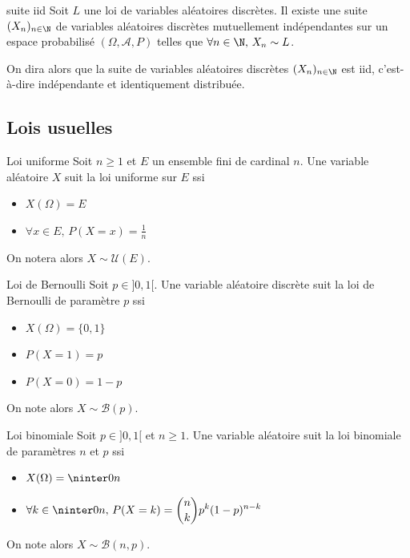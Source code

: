 \begin{corollaire}{suite iid}{}
    Soit $L$ une loi de variables aléatoires discrètes. Il existe une suite 
    $(X_n)_{n \in \N}$ de variables aléatoires discrètes mutuellement indépendantes
    sur un espace probabilisé $(\Omega, \mathcal A, P)$ telles que $\forall n \in \N, \, X_n \sim L$.

    On dira alors que la suite de variables aléatoires discrètes $(X_n)_{n \in \N}$ 
    est iid, c'est-à-dire indépendante et identiquement distribuée.
\end{corollaire}

\subsection{Lois usuelles}

\begin{definition}{Loi uniforme}{}
    Soit $n \geqslant 1$ et $E$ un ensemble fini de cardinal $n$. Une variable aléatoire $X$ suit la 
    loi uniforme sur $E$ ssi 
    \begin{itemize}
        \item $X(\Omega) = E$
        \item $\forall x \in E, \, P(X = x) = \frac 1 n$
    \end{itemize}

    On notera alors $X \sim \mathcal U(E)$.
\end{definition}


\begin{definition}{Loi de Bernoulli}{}
    Soit $p \in ]0, 1[$. Une variable aléatoire discrète suit la loi de Bernoulli de paramètre 
    $p$ ssi 
    \begin{itemize}
        \item $X(\Omega) = \{0, 1\}$
        \item $P(X = 1) = p$ 
        \item $P(X = 0) = 1 - p$
    \end{itemize}
    On note alors $X \sim \mathcal B(p)$.
\end{definition}

\begin{definition}{Loi binomiale}{}
    Soit $p \in ]0, 1[$ et $n \geqslant 1$. Une variable aléatoire suit la loi binomiale de 
    paramètres $n$ et $p$ ssi 
    \begin{itemize}
        \item $X(\Omega) = \ninter 0 n$
        \item $\displaystyle \forall k \in \ninter 0 n, \, P(X = k) = \binom n k p^k (1 - p)^{n - k}$
    \end{itemize}
    On note alors $X \sim \mathcal B(n, p)$.
\end{definition}


